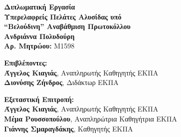 \begin{center}
    \vspace{3cm}
    \large \textbf{Διπλωματική Εργασία}\\
    \vspace{3cm}
    \textbf{Υπερελαφρείς Πελάτες Αλυσίδας υπό \\
    ``Βελούδινη'' Aναβάθμιση Πρωτοκόλλου}\\
    \vspace{3cm}
    \large \textbf{Ανδριάννα Πολυδούρη}\\
    \textbf{Αρ. Μητρώου:} M1598
 
    \begin{flushleft}
        \textbf{Επιβλέποντες:}\\ 
        \hspace{2cm}
        \textbf{Άγγελος Κιαγιάς}, Αναπληρωτής Καθηγητής ΕΚΠΑ\\
        \hspace{2cm}
        \textbf{Διονύσης Ζήνδρος}, Διδάκτωρ ΕΚΠΑ

        \textbf{Εξεταστική Επιτροπή:}\\ 
        \hspace{2cm}
        \textbf{Άγγελος Κιαγιάς}, Αναπληρωτής Καθηγητής ΕΚΠΑ\\
        \hspace{2cm}
        \textbf{Μέμα Ρουσσοπούλου}, Αναπληρώτρια Καθηγήτρια ΕΚΠΑ\\
        \hspace{2cm}
        \textbf{Γιάννης Σμαραγδάκης}, Καθηγητής ΕΚΠΑ

    \end{flushleft}
\end{center}


\pagebreak